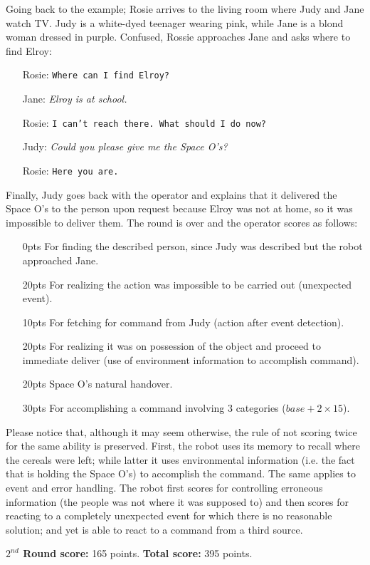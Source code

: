 Going back to the example; Rosie arrives to the living room where Judy and Jane watch TV. Judy is a white-dyed teenager wearing pink, while Jane is a blond woman dressed in purple. Confused, Rossie approaches Jane and asks where to find Elroy:
\begin{itemize}
	\item[Rosie:] \texttt{Where can I find Elroy?}
	\item[Jane: ] \textit{Elroy is at school.}
	\item[Rosie:] \texttt{I can't reach there. What should I do now?}
	\item[Judy: ] \textit{Could you please give me the Space O's?}
	\item[Rosie:] \texttt{Here you are.}
\end{itemize}

Finally, Judy goes back with the operator and explains that it delivered the Space O's to the person upon request because Elroy was not at home, so it was impossible to deliver them. The round is over and the operator scores as follows:
\begin{itemize}
	\item[ 0pts] For finding the described person, since Judy was described but the robot approached Jane.
	\item[20pts] For realizing the action was impossible to be carried out (unexpected event).
	\item[10pts] For fetching for command from Judy (action after event detection).
	\item[20pts] For realizing it was on possession of the object and proceed to immediate deliver (use of environment information to accomplish command).
	\item[20pts] Space O's natural handover.
	\item[30pts] For accomplishing a command involving 3 categories ($base + 2\times15$).
\end{itemize}

Please notice that, although it may seem otherwise, the rule of not scoring twice for the same ability is preserved. First, the robot uses its memory to recall where the cereals were left; while latter it uses environmental information (i.e. the fact that is holding the Space O's) to accomplish the command. The same applies to event and error handling. The robot first scores for controlling erroneous information (the people was not where it was supposed to) and then scores for reacting to a completely unexpected event for which there is no reasonable solution; and yet is able to react to a command from a third source.

\textbf{$2^{nd}$ Round score:} 165 points. \textbf{Total score:} 395 points.
